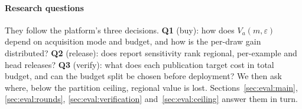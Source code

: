 \paragraph{Research questions}
They follow the platform's three decisions. \textbf{Q1} (buy): how does
$V_a(m,\varepsilon)$ depend on acquisition mode and budget, and how is the
per-draw gain distributed? \textbf{Q2} (release): does report sensitivity rank
regional, per-example and head releases? \textbf{Q3} (verify): what does each
publication target cost in total budget, and can the budget split be chosen
before deployment? We then ask where, below the partition ceiling, regional
value is lost. Sections~\ref{sec:eval:main}, \ref{sec:eval:rounds},
\ref{sec:eval:verification} and~\ref{sec:eval:ceiling} answer them in turn.
